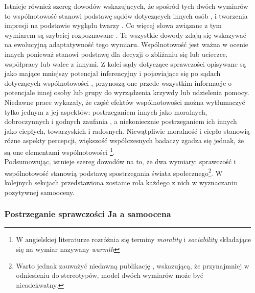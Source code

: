 \documentclass[man]{apa6}
\begin{document}
Istnieje również szereg dowodów wskazujących, że spośród tych dwóch wymiarów to wspólnotowość stanowi podstawę sądów dotyczących innych osób \parencite[np.,][]{wojciszke1998dominance}, i tworzenia impresji na podstawie wyglądu twarzy \parencite{willis2006first}. Co więcej słowa związane z tym wymiarem są szybciej rozpoznawane \parencite{ybarra2001young}. Te wszystkie dowody zdają się wskazywać na ewolucyjną adaptatywność tego wymiaru. Wspólnotowość jest ważna w ocenie innych ponieważ stanowi podstawę dla decyzji o zbliżaniu się lub ucieczce, współpracy lub walce z innymi. Z kolei sądy dotyczące sprawczości opisywane są jako mające mniejszy potencjał inferencyjny i pojawiające się po sądach dotyczących wspólnotowości \parencite[np.,][]{fiske2007universal}, przynoszą one przede wszystkim informacje o potencjale innej osoby lub grupy do wyrządzenia krzywdy lub udzielenia pomocy.\\

Niedawne prace wykazały, że część efektów wspólnotowości można wytłumaczyć tylko jednym z jej aspektów: postrzeganiem innych jako moralnych, dobroczynnych i godnych zaufania \parencite[patrz,][]{brambilla2011looking, goodwin2014moral, brambilla2012you, brambilla2014importance}, a niekoniecznie postrzeganiem ich innych jako ciepłych, towarzyskich i radosnych. Niewątpliwie moralność i ciepło stanowią różne aspekty percepcji, większość współczesnych badaczy zgadza się jednak, że są one elementami wspólnotowości \parencite[patrz np.,][]{leach2007group}\footnote{W angielskiej literaturze rozróżnia się terminy \emph{morality} i \emph{sociability} składające się na wymiar nazywany \emph{warmth}}.\\

Podsumowując, istnieje szereg dowodów na to, że dwa wymiary: sprawczość i wspólnotowość stanowią podstawę spostrzegania świata społecznego\footnote{Warto jednak zauważyć niedawną publikację \textcite{koch2016abc}, wskazującą, że przynajmniej w odniesieniu do stereotypów, model dwóch wymiarów może być nieadekwatny.}. W kolejnych sekcjach przedstawiona zostanie rola każdego z nich w wyznaczaniu pozytywnej samooceny.\\

\subsubsection{Postrzeganie sprawczości Ja a samoocena}
\end{document}
